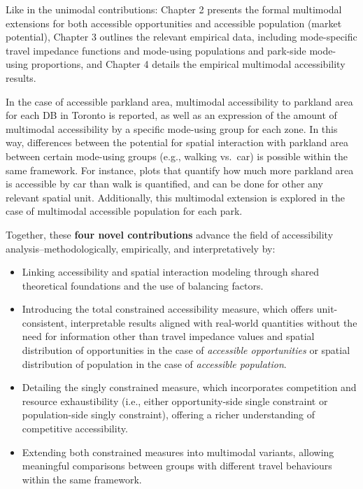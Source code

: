\documentclass[
11pt, %
oneside, %
english, %
singlespacing, %
]{macthesis} %
\def\tightlist{}
\begin{document}
Like in the unimodal contributions: Chapter 2 presents the formal multimodal extensions for both accessible opportunities and accessible population (market potential), Chapter 3 outlines the relevant empirical data, including mode-specific travel impedance functions and mode-using populations and park-side mode-using proportions, and Chapter 4 details the empirical multimodal accessibility results.

In the case of accessible parkland area, multimodal accessibility to parkland area for each DB in Toronto is reported, as well as an expression of the amount of multimodal accessibility by a specific mode-using group for each zone. In this way, differences between the potential for spatial interaction with parkland area between certain mode-using groups (e.g., walking vs.~car) is possible within the same framework. For instance, plots that quantify how much more parkland area is accessible by car than walk is quantified, and can be done for other any relevant spatial unit. Additionally, this multimodal extension is explored in the case of multimodal accessible population for each park.

Together, these \textbf{four novel contributions} advance the field of accessibility analysis--methodologically, empirically, and interpretatively by:

\begin{itemize}
\tightlist
\item
  Linking accessibility and spatial interaction modeling through shared theoretical foundations and the use of balancing factors.
\item
  Introducing the total constrained accessibility measure, which offers unit-consistent, interpretable results aligned with real-world quantities without the need for information other than travel impedance values and spatial distribution of opportunities in the case of \emph{accessible opportunities} or spatial distribution of population in the case of \emph{accessible population}.
\item
  Detailing the singly constrained measure, which incorporates competition and resource exhaustibility (i.e., either opportunity-side single constraint or population-side singly constraint), offering a richer understanding of competitive accessibility.
\item
  Extending both constrained measures into multimodal variants, allowing meaningful comparisons between groups with different travel behaviours within the same framework.
\end{itemize}
\end{document}
